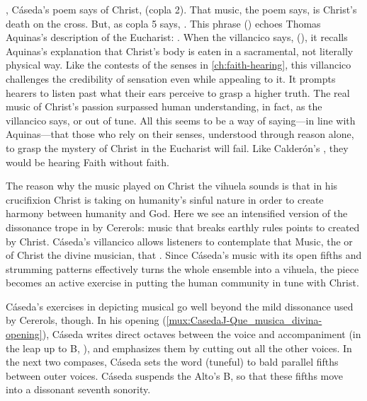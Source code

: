 , Cáseda's poem says of Christ,
 (copla 2).
That music, the poem says, is Christ's death on the cross.
But, as copla 5 says, .
This phrase () echoes Thomas Aquinas's
description of the Eucharist: .%
When the villancico says,  (),
it recalls Aquinas's explanation that Christ's body is eaten in a sacramental,
not literally physical way.
Like the contests of the senses in \cref{ch:faith-hearing}, this villancico
challenges the credibility of sensation even while appealing to it.
It prompts hearers to listen past what their ears perceive to grasp a higher
truth.
The real music of Christ's passion surpassed human understanding, in fact, as
the villancico says,  or out of tune.
All this seems to be a way of saying---in line with Aquinas---that those who
rely on their senses, understood through reason alone, to grasp the mystery of
Christ in the Eucharist will fail.
Like Calderón's , they would be hearing Faith without faith.

The reason why the music played on Christ the vihuela sounds  is
that in his crucifixion Christ is taking on humanity's sinful nature in order
to create harmony between humanity and God.
Here we see an intensified version of the dissonance trope in
 by Cererols: music that breaks earthly rules points
to  created by Christ.
Cáseda's villancico allows listeners to contemplate that Music, the
 or  of Christ the divine
musician, that .
Since Cáseda's music with its open fifths and strumming patterns effectively
turns the whole ensemble into a vihuela, the piece becomes an active exercise
in putting the human community in tune with Christ.

Cáseda's exercises in depicting musical  go well beyond the
mild dissonance used by Cererols, though.
In his opening (\cref{mux:CasedaJ-Que_musica_divina-opening}), Cáseda writes
direct octaves between the voice and accompaniment (in the leap up to B\fl,
), and emphasizes them by cutting out all the other voices.
In the next two compases, Cáseda sets the word  (tuneful) to
bald parallel fifths between outer voices.
Cáseda suspends the Alto's B\fl, so that these fifths move into a dissonant
seventh sonority.

